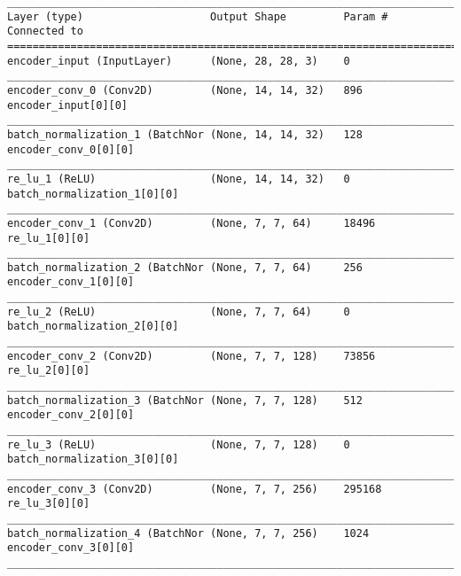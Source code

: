 \begin{lstlisting}[caption={\textsc{Mnist}-VAE Encoder},captionpos=b,basicstyle=\tiny, label={lst:mnist-vae-encoder}]
__________________________________________________________________________________________________
Layer (type)                    Output Shape         Param #     Connected to
==================================================================================================
encoder_input (InputLayer)      (None, 28, 28, 3)    0
__________________________________________________________________________________________________
encoder_conv_0 (Conv2D)         (None, 14, 14, 32)   896         encoder_input[0][0]
__________________________________________________________________________________________________
batch_normalization_1 (BatchNor (None, 14, 14, 32)   128         encoder_conv_0[0][0]
__________________________________________________________________________________________________
re_lu_1 (ReLU)                  (None, 14, 14, 32)   0           batch_normalization_1[0][0]
__________________________________________________________________________________________________
encoder_conv_1 (Conv2D)         (None, 7, 7, 64)     18496       re_lu_1[0][0]
__________________________________________________________________________________________________
batch_normalization_2 (BatchNor (None, 7, 7, 64)     256         encoder_conv_1[0][0]
__________________________________________________________________________________________________
re_lu_2 (ReLU)                  (None, 7, 7, 64)     0           batch_normalization_2[0][0]
__________________________________________________________________________________________________
encoder_conv_2 (Conv2D)         (None, 7, 7, 128)    73856       re_lu_2[0][0]
__________________________________________________________________________________________________
batch_normalization_3 (BatchNor (None, 7, 7, 128)    512         encoder_conv_2[0][0]
__________________________________________________________________________________________________
re_lu_3 (ReLU)                  (None, 7, 7, 128)    0           batch_normalization_3[0][0]
__________________________________________________________________________________________________
encoder_conv_3 (Conv2D)         (None, 7, 7, 256)    295168      re_lu_3[0][0]
__________________________________________________________________________________________________
batch_normalization_4 (BatchNor (None, 7, 7, 256)    1024        encoder_conv_3[0][0]
__________________________________________________________________________________________________

\end{lstlisting}
